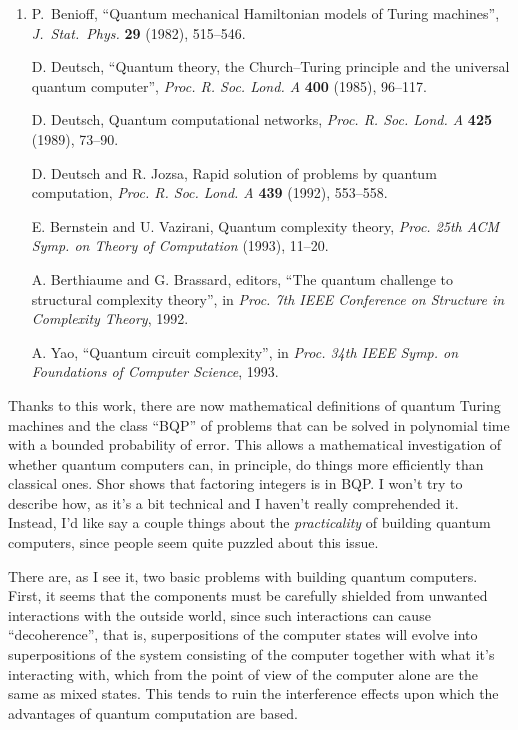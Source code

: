 \documentclass[12pt]{article}
\begin{document}
\begin{enumerate}
\def\labelenumi{\arabic{enumi})}
\setcounter{enumi}{2}
\item
    P.\  Benioff,
  ``Quantum mechanical Hamiltonian models of Turing machines'', \emph{J.\ Stat.\ Phys.} 
   \textbf{29} (1982), 515--546.

  D. Deutsch, ``Quantum theory, the Church--Turing principle and the universal
  quantum computer'',  \emph{Proc. R. Soc. Lond. A}
  \textbf{400} (1985), 96--117.

  D. Deutsch, Quantum computational networks, \emph{Proc. R. Soc.
  Lond. A} \textbf{425} (1989), 73--90.

  D. Deutsch and R. Jozsa, Rapid solution of problems by quantum computation, 
  \emph{Proc. R. Soc. Lond. A } \textbf{439} (1992), 553--558.

  E. Bernstein and U. Vazirani, Quantum complexity theory, \emph{Proc.
  25th ACM Symp. on Theory of Computation} (1993), 11--20.

   A. Berthiaume and G. Brassard, editors, ``The quantum challenge to structural complexity theory'', 
   in  \emph{Proc. 7th IEEE Conference on
  Structure in Complexity Theory}, 1992.

   A. Yao, ``Quantum circuit complexity'', in \emph{Proc. 34th IEEE Symp.
  on Foundations of Computer Science}, 1993.
\end{enumerate}
\noindent
Thanks to this work, there are now mathematical definitions of quantum
Turing machines and the class ``BQP'' of problems that can be solved in
polynomial time with a bounded probability of error. This allows a
mathematical investigation of whether quantum computers can, in
principle, do things more efficiently than classical ones. Shor shows
that factoring integers is in BQP. I won't try to describe how, as it's
a bit technical and I haven't really comprehended it. Instead, I'd like
say a couple things about the \emph{practicality} of building quantum
computers, since people seem quite puzzled about this issue.

There are, as I see it, two basic problems with building quantum
computers. First, it seems that the components must be carefully
shielded from unwanted interactions with the outside world, since such
interactions can cause ``decoherence'', that is, superpositions of the
computer states will evolve into superpositions of the system consisting
of the computer together with what it's interacting with, which from the
point of view of the computer alone are the same as mixed states. This
tends to ruin the interference effects upon which the advantages of
quantum computation are based.
\end{document}
